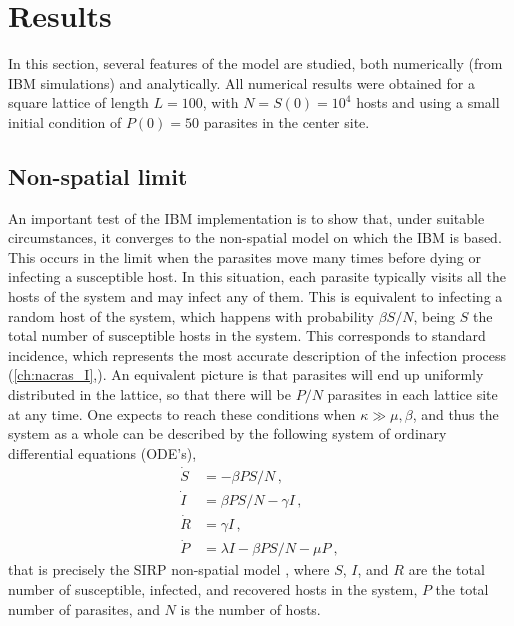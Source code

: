 \section{Results}\label{sec:results}
In this section, several features of the model are studied, both numerically
(from IBM simulations) and analytically. All numerical results were obtained
for a square lattice of length $L=100$, with $N=S(0)=10^4$ hosts and using a
small initial condition of $P(0)=50$ parasites in the center site.

\subsection{Non-spatial limit} \label{sec:MFlimit}
An important test of the IBM implementation is to show that, under suitable
circumstances, it converges to the non-spatial model on which the IBM is based.
This occurs in the limit when the parasites move many times before dying or
infecting a susceptible host. In this situation, each parasite typically visits
all the hosts of the system and may infect any of them. This is equivalent to
infecting a random host of the system, which happens with probability $\beta
    S/N$, being $S$ the total number of susceptible hosts in the system.
This corresponds to standard incidence, which represents the most accurate
description of the infection process
(\cref{ch:nacras_I},\cite{GimenezRomero2021}).
An equivalent picture is that parasites will end up uniformly distributed in
the lattice, so that there will be $P/N$ parasites in each lattice site at any
time. One expects to reach these conditions when $\kappa\gg\mu,\beta$, and
thus the system as a whole can be described by the following system of ordinary
differential equations (ODE's),
\begin{equation}\label{eq:SIRP_MF}
    \begin{aligned}
        \dot{S} & =-\beta P S/N \, ,               \\
        \dot{I} & =\beta P S/N-\gamma I \, ,       \\
        \dot{R} & =\gamma I \, ,                   \\
        \dot{P} & =\lambda I-\beta P S/N-\mu P \ ,
    \end{aligned}
\end{equation}
that is precisely the SIRP non-spatial model \cite{GimenezRomero2021}, where
$S$, $I$, and $R$ are the total number of susceptible, infected, and recovered
hosts in the system, $P$ the total number of parasites, and $N$ is the number
of hosts.

